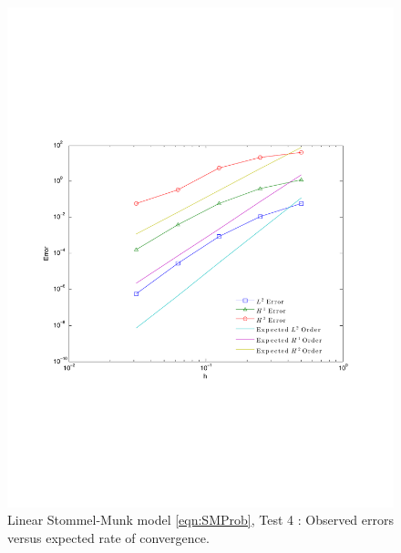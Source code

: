 \begin{figure}
  \begin{center}
    \includegraphics[scale=0.5]{Figures/SMeConvergence.pdf}
    \caption{Linear Stommel-Munk model \eqref{eqn:SMProb}, Test 4 \cite{Cascon}:
      Observed errors versus expected rate of convergence.}
    \label{fig:SMeErrors}
  \end{center}
\end{figure}

